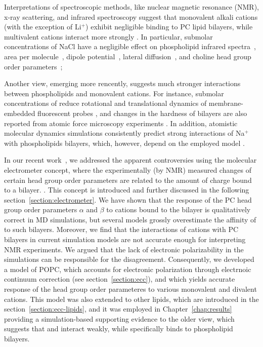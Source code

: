 Interpretations of spectroscopic methods, like nuclear magnetic resonance (NMR), 
x-ray scattering, and infrared spectroscopy suggest that monovalent alkali cations (with the exception of Li$^+$) 
exhibit negligible binding to PC lipid bilayers, 
while multivalent cations interact more strongly 
\citep{cevc90,tocanne90, hauser76,hauser78,herbette84,altenbach84,uhrikova08}.
In particular, submolar concentrations of NaCl have a negligible effect on
phospholipid infrared spectra~\citep{binder02},
area per molecule~\citep{pabst07},
dipole potential~\citep{clarke99},
lateral diffusion~\citep{filippov09},
and choline head group order parameters~\citep{akutsu81};

Another view, emerging more rencently, suggests much stronger interactions between phospholipids and monovalent cations. 
For instance, submolar concentrations of  reduce rotational and translational dynamics of membrane-embedded fluorescent probes \citep{bockmann03,vacha09a,harb13}, 
and changes in the hardness of bilayers are also reported from atomic force microscopy experiments \citep{manyes05,manyes06,fukuma07,ferber11,morata12}.
In addition, atomistic molecular dynamics simulations consistently predict strong interactions of Na${^+}$ with phospholipids bilayers,
which, however, depend on the employed model \citep{bockmann03,bockmann04,sachs04,berkowitz06,cordomi08,cordomi09,valley11,berkowitz12,catte16,nmrlipids_proj4,melcr18}.

In our recent work~\citep{catte16}, we addressed the apparent controversies 
using the molecular electrometer concept, 
where the experimentally (by NMR) measured changes of certain head group order parameters 
are related to the amount of charge bound to a bilayer. \citep{brown77,akutsu81,altenbach84,seelig87,scherer89}.
This concept is introduced and further discussed in the following section~\ref{section:electrometer}. 
We have shown that the response of the PC head group order parameters $\alpha$ and $\beta$ 
to cations bound to the bilayer is qualitatively correct in MD simulations, 
but several models grossly overestimate the affinity of  to such bilayers. 
Moreover, we find that the interactions of  cations with PC bilayers
in current simulation models are not accurate enough for interpreting NMR experiments. 
We argued that the lack of electronic polarizability in the simulations 
can be responsible for the disagreement. 
Consequently, we developed a model of POPC, 
which accounts for electronic polarization through electrnoic continuum correction (see section~\ref{section:ecc}), 
and which yields accurate response of the head group order parameteres to various monovalent and divalent cations. \citep{melcr18}
This model was also extended to other lipids, which are introduced in the section~\ref{section:ecc-lipids}, 
and it was employed in Chapter~\ref{chap:results} 
providing a simulation-based supporting evidence to the older view,
which suggests that  and  interact weakly, 
while  specifically binds to phospholipid bilayers.







